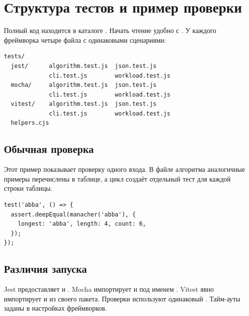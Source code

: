 \chapter{Структура тестов и пример проверки}\label{appendix-app-code}
Полный код находится в каталоге . Начать чтение удобно с . У каждого фреймворка четыре файла с одинаковыми сценариями:
\begin{Verbatim}[fontsize=\small,frame=single]
tests/
  jest/      algorithm.test.js  json.test.js
             cli.test.js        workload.test.js
  mocha/     algorithm.test.js  json.test.js
             cli.test.js        workload.test.js
  vitest/    algorithm.test.js  json.test.js
             cli.test.js        workload.test.js
  helpers.cjs
\end{Verbatim}
\section*{Обычная проверка}
Этот пример показывает проверку одного входа. В файле алгоритма аналогичные примеры перечислены в таблице, а цикл создаёт отдельный тест для каждой строки таблицы.
\begin{Verbatim}[fontsize=\small,frame=single]
test('abba', () => {
  assert.deepEqual(manacher('abba'), {
    longest: 'abba', length: 4, count: 6,
  });
});
\end{Verbatim}
\section*{Различия запуска}
Jest предоставляет  и . Mocha импортирует  и  под именем . Vitest явно импортирует  и  из своего пакета. Проверки используют одинаковый . Тайм-ауты заданы в настройках фреймворков.
